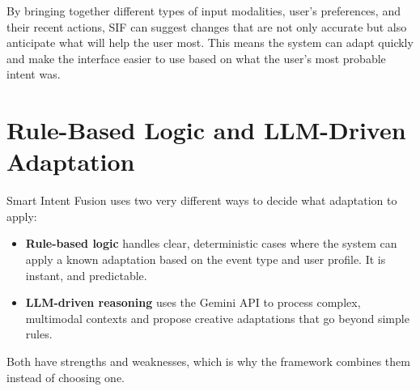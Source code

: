 By bringing together different types of input modalities, user’s preferences, and their recent actions, SIF can suggest changes that are not only accurate but also anticipate what will help the user most. This means the system can adapt quickly and make the interface easier to use based on what the user's most probable intent was.

\section{Rule-Based Logic and LLM-Driven Adaptation}
Smart Intent Fusion uses two very different ways to decide what adaptation to apply:
\begin{itemize}
    \item \textbf{Rule-based logic} handles clear, deterministic cases where the system can apply a known adaptation based on the event type and user profile. It is instant, and predictable.
    \item \textbf{LLM-driven reasoning} uses the Gemini API to process complex, multimodal contexts and propose creative adaptations that go beyond simple rules.
\end{itemize}
Both have strengths and weaknesses, which is why the framework combines them instead of choosing one.

